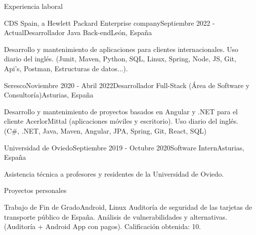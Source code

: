 \documentclass{resume} %
\begin{document}

\begin{rSection}{Experiencia laboral}

\begin{rSubsection}{CDS Spain, a Hewlett Packard Enterprise company}{Septiembre 2022 - Actual}{Desarrollador Java Back-end}{León, España}
\item Desarrollo y mantenimiento de aplicaciones para clientes internacionales. Uso diario del inglés. (Junit, Maven, Python, SQL, Linux, Spring, Node, JS, Git, Api's, Postman, Estructuras de datos...).
\end{rSubsection}

\begin{rSubsection}{Seresco}{Noviembre 2020 - Abril 2022}{Desarrollador Full-Stack (Área de Software y Consultoría)}{Asturias, España}
\item Desarrollo y mantenimiento de proyectos basados en Angular y .NET para el cliente AcerlorMittal (aplicaciones móviles y escritorio). Uso diario del inglés. (C\#, .NET, Java, Maven, Angular, JPA, Spring, Git, React, SQL)
\end{rSubsection}

\begin{rSubsection}{Universidad de Oviedo}{Septiembre 2019 - Octubre 2020}{Software Intern}{Asturias, España}
\item Asistencia técnica a profesores y residentes de la Universidad de Oviedo.
\end{rSubsection}

\end{rSection}


\begin{rSection}{Proyectos personales}
\begin{rSubsection}{{Trabajo de Fin de Grado}}{Android, Linux}{}{}
Auditoría de seguridad de las tarjetas de transporte público de España. Análisis de vulnerabilidades y alternativas. (Auditoría + Android App con pagos).
Calificación obtenida: 10.
\end{rSubsection}
\end{rSection}
\end{document}
